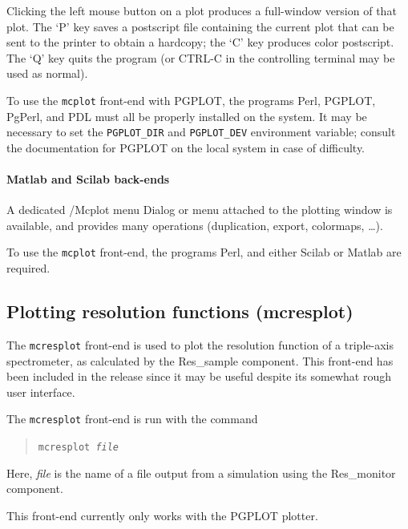 Clicking the left mouse button on a plot produces a full-window version
of that plot. The `P' key saves a postscript file containing the current
plot that can be sent to the printer to obtain a hardcopy; the `C' key
produces color postscript. 
The `Q' key quits the program (or CTRL-C in the controlling
terminal may be used as normal).

To use the \verb+mcplot+ front-end with PGPLOT, the programs Perl, PGPLOT,
PgPerl, and PDL must all be properly installed on the system.  It may be
necessary to set the \verb+PGPLOT_DIR+ and \verb+PGPLOT_DEV+ environment
variable; consult the documentation for PGPLOT on the local system in case of
difficulty.   

\paragraph{Matlab and Scilab back-ends}

A dedicated \MCS /Mcplot menu Dialog or menu attached to the plotting window is available, and provides many operations (duplication, export, colormaps, \ldots).

To use the \verb+mcplot+ front-end, the programs Perl, and either Scilab or Matlab are required.  


\subsection{Plotting resolution functions (mcresplot)}
\label{s:mcresplot}

The \verb+mcresplot+ front-end is used to plot the resolution function
of a triple-axis 
spectrometer, as
calculated by the Res\_sample component. 
This front-end 
has been included in the release since it may be useful
despite its somewhat rough user interface.

The \verb+mcresplot+ front-end is run with the command
\begin{quote}
  \texttt{mcresplot {\it file\/}}
\end{quote}
Here, {\it file\/} is the name of a file output from a simulation using
the Res\_monitor component.

This front-end currently only works with the PGPLOT plotter.

